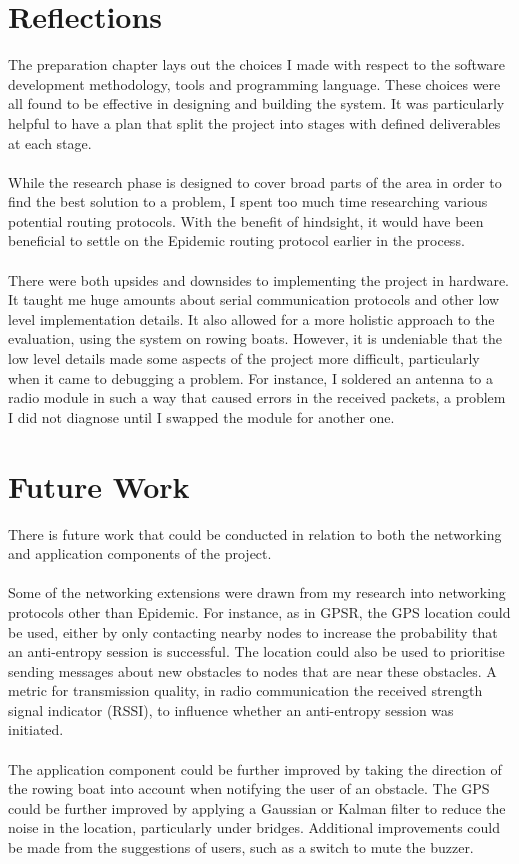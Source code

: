 \documentclass[12pt,a4paper]{report}
\begin{document}
{\section{Reflections}
The preparation chapter lays out the choices I made with respect to the software development methodology, tools and programming language. These choices were all found to be effective in designing and building the system. It was particularly helpful to have a plan that split the project into stages with defined deliverables at each stage. \\ \\ 
While the research phase is designed to cover broad parts of the area in order to find the best solution to a problem, I spent too much time researching various potential routing protocols. With the benefit of hindsight, it would have been beneficial to settle on the Epidemic routing protocol earlier in the process. \\ \\
There were both upsides and downsides to implementing the project in hardware. It taught me huge amounts 
about serial communication protocols and other low level implementation details. It also allowed for a more holistic approach to the evaluation, using the system on rowing boats. However, it is undeniable that the low level details made some aspects of the project more difficult, particularly when it came to debugging a problem. For instance, I soldered an antenna to a radio module in such a way that caused errors in the received packets, a problem I did not diagnose until I swapped the module for another one. 

\section{Future Work}
There is future work that could be conducted in relation to both the networking and application components of the project. \\ \\
Some of the networking extensions were drawn from my research into networking protocols other than Epidemic. For instance, as in GPSR, the GPS location could be used, either by only contacting nearby nodes to increase the probability that an anti-entropy session is successful. The location could also be used to prioritise sending messages about new obstacles to nodes that are near these obstacles.  A metric for transmission quality, in radio communication the received strength signal indicator (RSSI), to influence whether an anti-entropy session was initiated. \\ \\ 
The application component could be further improved by taking the direction of the rowing boat into account when notifying the user of an obstacle. The GPS could be further improved by applying a Gaussian or Kalman filter to reduce the noise in the location, particularly under bridges. Additional improvements could be made from the suggestions of users, such as a switch to mute the buzzer. 

}
\end{document}
